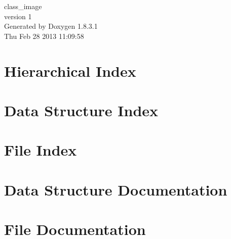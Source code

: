 \documentclass{book}
\begin{document}
\hypersetup{pageanchor=false,citecolor=blue}
\begin{titlepage}
\vspace*{7cm}
\begin{center}
{\Large class\-\_\-image \\[1ex]\large version 1 }\\
\vspace*{1cm}
{\large Generated by Doxygen 1.8.3.1}\\
\vspace*{0.5cm}
{\small Thu Feb 28 2013 11:09:58}\\
\end{center}
\end{titlepage}
\clearemptydoublepage
{}
\tableofcontents
\clearemptydoublepage
{}
\hypersetup{pageanchor=true,citecolor=blue}
\chapter{Hierarchical Index}

\chapter{Data Structure Index}

\chapter{File Index}

\chapter{Data Structure Documentation}







\chapter{File Documentation}







\printindex
\end{document}
